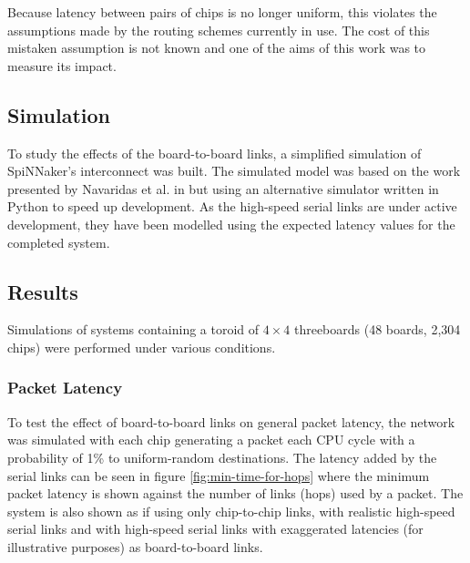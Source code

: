 		Because latency between pairs of chips is no longer uniform, this violates
		the assumptions made by the routing schemes currently in use. The cost of
		this mistaken assumption is not known and one of the aims of this work was
		to measure its impact.
		
		\subsection{Simulation}
			
			To study the effects of the board-to-board links, a simplified simulation
			of SpiNNaker's interconnect was built. The simulated model was based on
			the work presented by Navaridas et al. in \cite{navaridas09} but using an
			alternative simulator written in Python to speed up development. As the
			high-speed serial links are under active development, they have been
			modelled using the expected latency values for the completed system.
			
		\subsection{Results}
			
			Simulations of systems containing a toroid of $4\times4$ threeboards (48
			boards, 2,304 chips) were performed under various conditions.
			
			\subsubsection{Packet Latency}
			
				To test the effect of board-to-board links on general packet latency, the network was
				simulated with each chip generating a packet each CPU cycle with a
				probability of 1\% to uniform-random destinations. The latency added by
				the serial links can be seen in figure \ref{fig:min-time-for-hops} where
				the minimum packet latency is shown against the number of links (hops)
				used by a packet. The system is also shown as if using only chip-to-chip
				links, with realistic high-speed serial links and with high-speed serial
				links with exaggerated latencies (for illustrative purposes) as
				board-to-board links.
				
